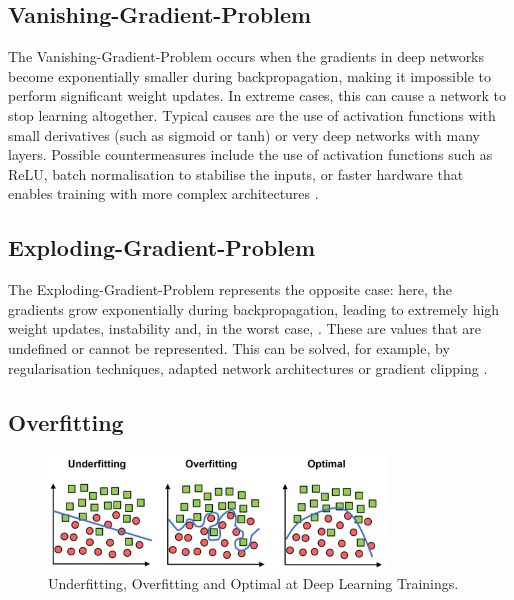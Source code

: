 \subsection{Vanishing-Gradient-Problem}

The Vanishing-Gradient-Problem occurs when the gradients in deep networks become exponentially smaller during backpropagation, making it impossible to perform significant weight updates. In extreme cases, this can cause a network to stop learning altogether. Typical causes are the use of activation functions with small derivatives (such as sigmoid or tanh) or very deep networks with many layers. Possible countermeasures include the use of activation functions such as \acrshort{ReLU}, batch normalisation to stabilise the inputs, or faster hardware that enables training with more complex architectures \cite{Alzubaidi2021}.
    

\subsection{Exploding-Gradient-Problem}

The Exploding-Gradient-Problem represents the opposite case: here, the gradients grow exponentially during backpropagation, leading to extremely high weight updates, instability and, in the worst case, . These are values that are undefined or cannot be represented. This can be solved, for example, by regularisation techniques, adapted network architectures or gradient clipping \cite{Alzubaidi2021}.
   

\subsection{Overfitting}
\label{subsec:overfitting}

\begin{figure}[h]
    \centering
    \includegraphics[width=0.8\textwidth]{images/011Fundamentals/overfitting.jpg}
    \caption{Underfitting, Overfitting and Optimal at Deep Learning Trainings. \cite{overfitting_pic} }
    \label{fig:overfitting}
\end{figure}


